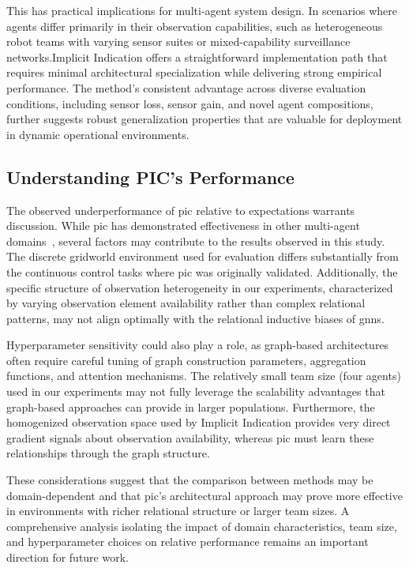 \documentclass[conference]{IEEEtran}
\begin{document}
This has practical implications for multi-agent system design. 
In scenarios where agents differ primarily in their observation capabilities, 
such as heterogeneous robot teams with varying sensor suites or 
mixed-capability surveillance networks.Implicit Indication offers a 
straightforward implementation path that requires minimal 
architectural specialization while delivering strong empirical performance. 
The method's consistent advantage across diverse evaluation conditions, 
including sensor loss, sensor gain, and novel agent compositions, 
further suggests robust generalization properties that are valuable 
for deployment in dynamic operational environments.

\subsection{Understanding PIC's Performance}

The observed underperformance of \gls{pic} relative to expectations 
warrants discussion. While \gls{pic} has demonstrated effectiveness 
in other multi-agent domains~\cite{liu2020b}, several factors may 
contribute to the results observed in this study. 
The discrete gridworld environment used for evaluation differs substantially 
from the continuous control tasks where \gls{pic} was originally validated. 
Additionally, the specific structure of observation heterogeneity in 
our experiments, characterized by varying observation element availability 
rather than complex relational patterns, may not align optimally with the 
relational inductive biases of \glspl{gnn}.

Hyperparameter sensitivity could also play a role, as graph-based 
architectures often require careful tuning of graph construction parameters, 
aggregation functions, and attention mechanisms. The relatively small team 
size (four agents) used in our experiments may not fully leverage the 
scalability advantages that graph-based approaches can provide in larger populations. 
Furthermore, the homogenized observation space used by Implicit Indication provides 
very direct gradient signals about observation availability, whereas \gls{pic} must 
learn these relationships through the graph structure.

These considerations suggest that the comparison between methods may be 
domain-dependent and that \gls{pic}'s architectural approach may prove more 
effective in environments with richer relational structure or larger team sizes. 
A comprehensive analysis isolating the impact of domain characteristics, 
team size, and hyperparameter choices on relative performance remains an 
important direction for future work.
\end{document}
